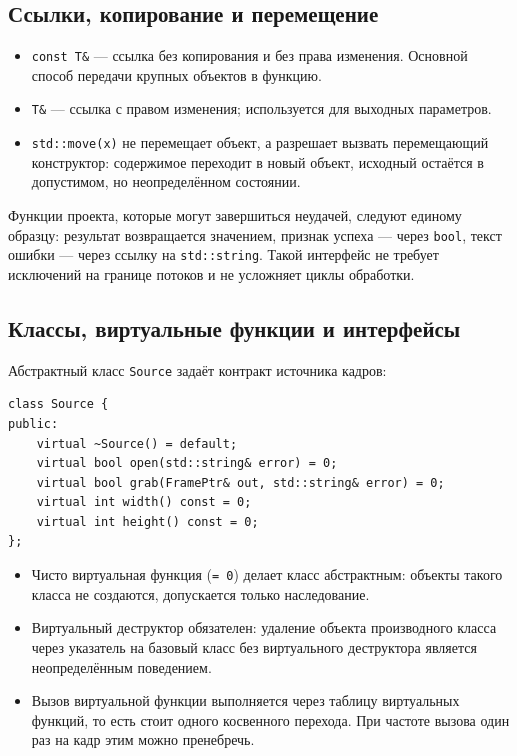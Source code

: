 \documentclass[11pt,a4paper]{article}
\theoremstyle{definition}
\theoremstyle{remark}
\begin{document}
\subsection{Ссылки, копирование и перемещение}

\begin{itemize}
  \item \texttt{const T\&} --- ссылка без копирования и без права изменения.
        Основной способ передачи крупных объектов в функцию.
  \item \texttt{T\&} --- ссылка с правом изменения; используется для
        выходных параметров.
  \item \texttt{std::move(x)} не перемещает объект, а разрешает вызвать
        перемещающий конструктор: содержимое переходит в новый объект,
        исходный остаётся в допустимом, но неопределённом состоянии.
\end{itemize}

Функции проекта, которые могут завершиться неудачей, следуют единому образцу:
результат возвращается значением, признак успеха --- через \texttt{bool},
текст ошибки --- через ссылку на \texttt{std::string}. Такой интерфейс не
требует исключений на границе потоков и не усложняет циклы обработки.

\subsection{Классы, виртуальные функции и интерфейсы}

Абстрактный класс \texttt{Source} задаёт контракт источника кадров:

\begin{lstlisting}
class Source {
public:
    virtual ~Source() = default;
    virtual bool open(std::string& error) = 0;
    virtual bool grab(FramePtr& out, std::string& error) = 0;
    virtual int width() const = 0;
    virtual int height() const = 0;
};
\end{lstlisting}

\begin{itemize}
  \item Чисто виртуальная функция (\texttt{= 0}) делает класс абстрактным:
        объекты такого класса не создаются, допускается только наследование.
  \item Виртуальный деструктор обязателен: удаление объекта производного
        класса через указатель на базовый класс без виртуального деструктора
        является неопределённым поведением.
  \item Вызов виртуальной функции выполняется через таблицу виртуальных
        функций, то есть стоит одного косвенного перехода. При частоте
        вызова один раз на кадр этим можно пренебречь.
\end{itemize}
\end{document}
